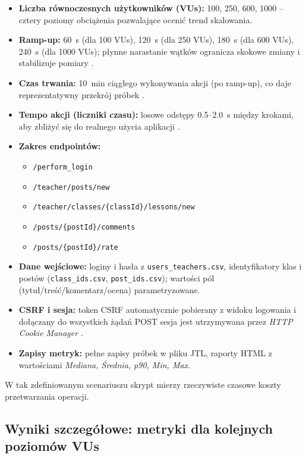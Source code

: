 \begin{itemize}
  \item \textbf{Liczba równoczesnych użytkowników (VUs):}
        100, 250, 600, 1000 \;-- cztery poziomy obciążenia pozwalające ocenić trend skalowania.
  \item \textbf{Ramp-up:} 60~s (dla 100 VUs), 120~s (dla 250 VUs), 180~s (dla 600 VUs), 240~s (dla 1000 VUs);
        płynne narastanie wątków ogranicza skokowe zmiany i stabilizuje pomiary \cite{jmeter-docs}.
  \item \textbf{Czas trwania:} 10~min ciągłego wykonywania akcji (po ramp-up), co daje reprezentatywny przekrój próbek \cite{jmeter-docs}.
  \item \textbf{Tempo akcji (liczniki czasu):} losowe odstępy 0.5--2.0~s między krokami, aby zbliżyć się do realnego użycia aplikacji \cite{jmeter-docs}.
\item \textbf{Zakres endpointów:}
    \begin{itemize}
        \item \texttt{/perform\_login}
        \item \texttt{/teacher/posts/new}
        \item \texttt{/teacher/classes/\{classId\}/lessons/new}
        \item \texttt{/posts/\{postId\}/comments}
        \item \texttt{/posts/\{postId\}/rate}
    \end{itemize}
  \item \textbf{Dane wejściowe:} loginy i hasła z \texttt{users\_teachers.csv}, identyfikatory klas i postów
        (\texttt{class\_ids.csv}, \texttt{post\_ids.csv}); wartości pól (tytuł/treść/komentarz/ocena) parametryzowane.
  \item \textbf{CSRF i sesja:} token CSRF automatycznie pobierany z widoku logowania i dołączany do wszystkich żądań POST
        sesja jest utrzymywana przez \emph{HTTP Cookie Manager} \cite{jmeter-docs}.
  \item \textbf{Zapisy metryk:} pełne zapisy próbek w pliku JTL, raporty HTML z wartościami
        \emph{Mediana, Średnia, p90, Min, Max}.
\end{itemize}

W tak zdefiniowanym scenariuszu skrypt mierzy rzeczywiste czasowe koszty przetwarzania operacji.
\subsection{Wyniki szczegółowe: metryki dla kolejnych poziomów VUs}

